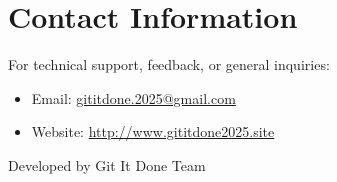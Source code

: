 \documentclass[12pt]{article}
\begin{document}
\section{Contact Information}

For technical support, feedback, or general inquiries:
\begin{itemize}
    \item Email: \href{mailto:gititdone.2025@gmail.com}{gititdone.2025@gmail.com}\\
    \item Website: \url{http://www.gititdone2025.site}
\end{itemize}

Developed by Git It Done Team
\end{document}
